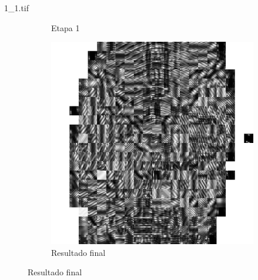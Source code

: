 \documentclass{beamer}
\begin{document}
\begin{frame}{1\_1.tif}
\begin{figure}
\begin{subfigure}[!ht]{0.32\textwidth}
                \caption{Etapa 1}
            \end{subfigure}
            \begin{subfigure}[!ht]{0.32\textwidth}
                \includegraphics[width=\columnwidth]{Fingerprints/1_1_final.jpg}
                \caption{Resultado final}
            \end{subfigure}
        \end{figure}
    \end{frame}
\end{document}
